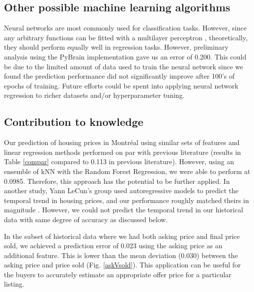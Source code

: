 \documentclass[conference]{IEEEtran}
\begin{document}
\subsection{Other possible machine learning algorithms}
Neural networks are most commonly used for classification tasks. However, since any arbitrary functions can be fitted with a multilayer perceptron \cite{Min69, grossberg1973ces}, theoretically, they should perform equally well in regression tasks. However, preliminary analysis using the PyBrain \cite{pybrain2010jmlr} implementation gave us an error of 0.200. This could be due to the limited amount of data used to train the neural network since we found the prediction performance did not significantly improve after 100's of epochs of training. Future efforts could be spent into applying neural network regression to richer datasets and/or hyperparameter tuning.

\subsection{Contribution to knowledge}
Our prediction of housing prices in Montr\'eal using similar sets of features and linear regression methods performed on par with previous literature \cite{belkuhwel80, Quinlan93combininginstance-based,RePEc:jre:issued:v:32:n:2:2010:p:139-160, SpatialDependence} (results in Table \ref{compar} compared to 0.113 in previous literature). However, using an ensemble of kNN with the Random Forest Regression, we were able to perform at 0.0985. Therefore, this approach has the potential to be further applied. In another study, Yann LeCun's group used autoregressive models to predict the temporal trend in housing prices, and our performance roughly matched theirs in magnitude \cite{Caplin08machinelearning}. However, we could not predict the temporal trend in our historical data with same degree of accuracy as discussed below.

In the subset of historical data where we had both asking price and final price sold, we achieved a prediction error of 0.023 using the asking price as an additional feature. This is lower than the mean deviation (0.030) between the asking price and price sold (Fig. \ref{askVsold}). This application can be useful for the buyers to accurately estimate an appropriate offer price for a particular listing.
\end{document}
